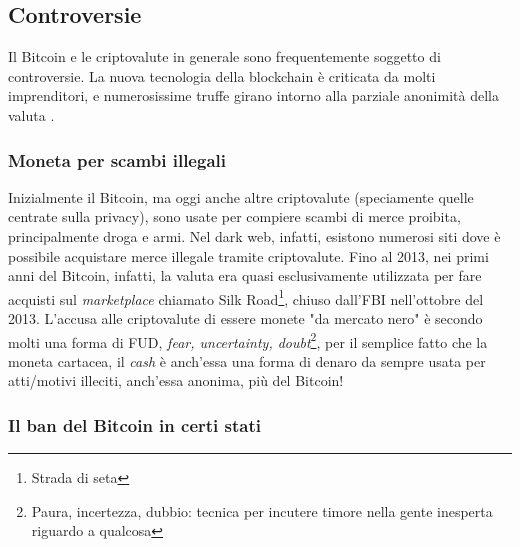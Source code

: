 \documentclass {article}
\begin{document}
%
%

\subsection {Controversie}


Il Bitcoin e le criptovalute in generale sono frequentemente soggetto di controversie. La nuova tecnologia della blockchain è criticata da molti imprenditori, e numerosissime truffe girano intorno alla parziale anonimità della valuta \cite{controversy}.


\subsubsection {Moneta per scambi illegali}


Inizialmente il Bitcoin, ma oggi anche altre criptovalute (speciamente quelle centrate sulla privacy), sono usate per compiere scambi di merce proibita, principalmente droga e armi.
Nel dark web, infatti, esistono numerosi siti dove è possibile acquistare merce illegale tramite criptovalute.
Fino al 2013, nei primi anni del Bitcoin, infatti, la valuta era quasi esclusivamente utilizzata per fare acquisti sul \textit{marketplace} chiamato Silk Road\footnote{Strada di seta}, chiuso dall'FBI nell'ottobre del 2013.
L'accusa alle criptovalute di essere monete "da mercato nero" è secondo molti una forma di FUD, \textit{fear, uncertainty, doubt}\footnote{Paura, incertezza, dubbio: tecnica per incutere timore nella gente inesperta riguardo a qualcosa}, per il semplice fatto che la moneta cartacea, il \textit{cash} è anch'essa una forma di denaro da sempre usata per atti/motivi illeciti, anch'essa anonima, più del Bitcoin! 


\subsubsection {Il ban del Bitcoin in certi stati}
\end{document}
